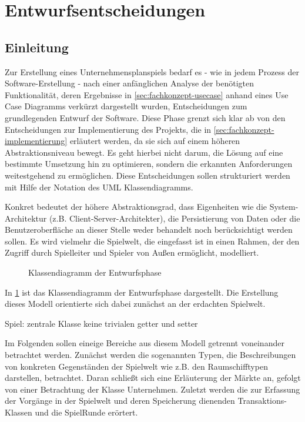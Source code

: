 \section{Entwurfsentscheidungen}
\label{sec:fachkonzept-entwurf}

\subsection{Einleitung}
Zur Erstellung eines Unternehmensplanspiels bedarf es - wie in jedem Prozess der Software-Erstellung - nach einer anfänglichen Analyse der benötigten Funktionalität, deren Ergebnisse in \ref{sec:fachkonzept-usecase} anhand eines Use Case Diagramms verkürzt dargestellt wurden, Entscheidungen zum grundlegenden Entwurf der Software. Diese Phase grenzt sich klar ab von den Entscheidungen zur Implementierung des Projekts, die in \ref{sec:fachkonzept-implementierung} erläutert werden, da sie sich auf einem höheren Abstraktionsniveau bewegt. Es geht hierbei nicht darum, die Lösung auf eine bestimmte Umsetzung hin zu optimieren, sondern die erkannten Anforderungen weitestgehend zu ermöglichen. Diese Entscheidungen sollen strukturiert werden mit Hilfe der Notation des UML Klassendiagramms.

Konkret bedeutet der höhere Abstraktionsgrad, dass Eigenheiten wie die System-Architektur (z.B. Client-Server-Architekter), die Persistierung von Daten oder die Benutzeroberfläche an dieser Stelle weder behandelt noch berücksichtigt werden sollen. Es wird vielmehr die Spielwelt, die eingefasst ist in einen Rahmen, der den Zugriff durch Spielleiter und Spieler von Außen ermöglicht, modelliert.

\begin{figure}

\caption{Klassendiagramm der Entwurfsphase}
\label{img:fachkonzept-entwurf-klassendiagramm}
\end{figure}

In \ref{img:fachkonzept-entwurf-klassendiagramm} ist das Klassendiagramm der Entwurfsphase dargestellt. Die Erstellung dieses Modell orientierte sich dabei zunächst an der erdachten Spielwelt. 

Spiel: zentrale Klasse
keine trivialen getter und setter

Im Folgenden sollen eineige Bereiche aus diesem Modell getrennt voneinander betrachtet werden. Zunächst werden die sogenannten Typen, die Beschreibungen von konkreten Gegenständen der Spielwelt wie z.B. den Raumschifftypen darstellen, betrachtet. Daran schließt sich eine Erläuterung der Märkte an, gefolgt von einer Betrachtung der Klasse Unternehmen. Zuletzt werden die zur Erfassung der Vorgänge in der Spielwelt und deren Speicherung dienenden Transaktions-Klassen und die SpielRunde erörtert.


